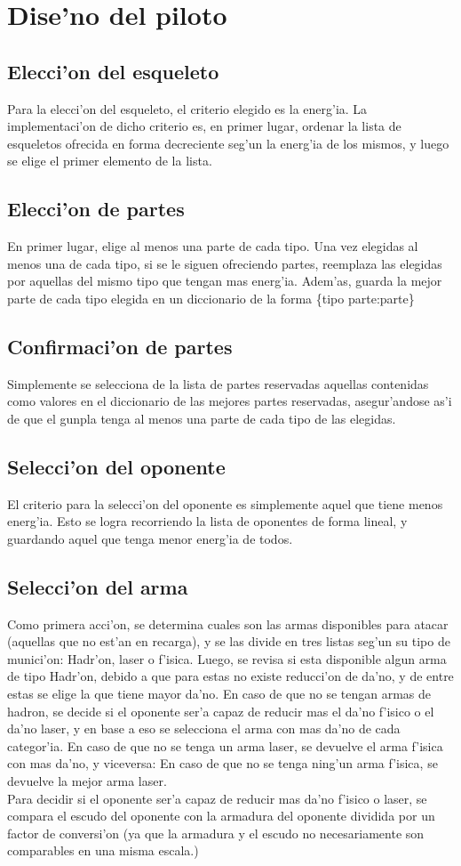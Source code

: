 \documentclass[12pt]{article}
\begin{document}
		\section{Dise'no del piloto}
		\subsection{Elecci'on del esqueleto}
		Para la elecci'on del esqueleto, el criterio elegido es la energ'ia. La implementaci'on de dicho criterio es, en primer lugar, ordenar la lista de esqueletos ofrecida en forma decreciente seg'un la energ'ia de los mismos, y luego se elige el primer elemento de la lista.
		\subsection{Elecci'on de partes}
		En primer lugar, elige al menos una parte de cada tipo. Una vez elegidas al menos una de cada tipo, si se le siguen ofreciendo partes, reemplaza las elegidas por aquellas del mismo tipo que tengan mas energ'ia. Adem'as, guarda la mejor parte de cada tipo elegida en un diccionario de la forma \{tipo parte:parte\}
		\subsection{Confirmaci'on de partes}
		Simplemente se selecciona de la lista de partes reservadas aquellas contenidas como valores en el diccionario de las mejores partes reservadas, asegur'andose as'i de que el gunpla tenga al menos una parte de cada tipo de las elegidas.
		\subsection{Selecci'on del oponente}
		El criterio para la selecci'on del oponente es simplemente aquel que tiene menos energ'ia. Esto se logra recorriendo la lista de oponentes de forma lineal, y guardando aquel que tenga menor energ'ia de todos.
		\subsection{Selecci'on del arma}
		Como primera acci'on, se determina cuales son las armas disponibles para atacar (aquellas que no est'an en recarga), y se las divide en tres listas seg'un su tipo de munici'on: Hadr'on, laser o f'isica. Luego, se revisa si esta disponible algun arma de tipo Hadr'on, debido a que para estas no existe reducci'on de da'no, y de entre estas se elige la que tiene mayor da'no. En caso de que no se tengan armas de hadron, se decide si el oponente ser'a capaz de reducir mas el da'no f'isico o el da'no laser, y en base a eso se selecciona el arma con mas da'no de cada categor'ia. En caso de que no se tenga un arma laser, se devuelve el arma f'isica con mas da'no, y viceversa: En caso de que no se tenga ning'un arma f'isica, se devuelve la mejor arma laser. \\
		Para decidir si el oponente ser'a capaz de reducir mas da'no f'isico o laser, se compara el escudo del oponente con la armadura del oponente dividida por un factor de conversi'on (ya que la armadura y el escudo no necesariamente son comparables en una misma escala.)
\end{document}
